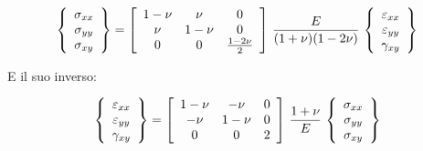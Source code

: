\begin{equation*}
\left\{
\begin{array}{c}
\sigma_{xx} \\
\sigma_{yy} \\
\sigma_{xy}
\end{array}
\right\}
=
\left[
\begin{array}{ccc}
\displaystyle 1-\nu & \displaystyle \nu & 0\\
\displaystyle \nu & 1-\nu & \large{0} \\
0& 0 & \frac{1-2\nu}{2}
\end{array}
\right]\,
\frac{E}{(1+\nu)(1-2\nu)}\,
\left\{
\begin{array}{c}
\varepsilon_{xx} \\
\varepsilon_{yy} \\
\gamma_{xy}
\end{array}
\right\}
\end{equation*}

E il suo inverso:

\begin{equation*}
\left\{
\begin{array}{c}
\varepsilon_{xx} \\
\varepsilon_{yy} \\
\gamma_{xy}
\end{array}
\right\}
=
\left[
\begin{array}{ccc}
\displaystyle 1-\nu & \displaystyle -\nu & 0\\
\displaystyle -\nu & 1-\nu & \large{0} \\
0& 0 & 2
\end{array}
\right]\,
\frac{1+\nu}{E}\,
\left\{
\begin{array}{c}
\sigma_{xx} \\
\sigma_{yy} \\
\sigma_{xy}
\end{array}
\right\}
\end{equation*}